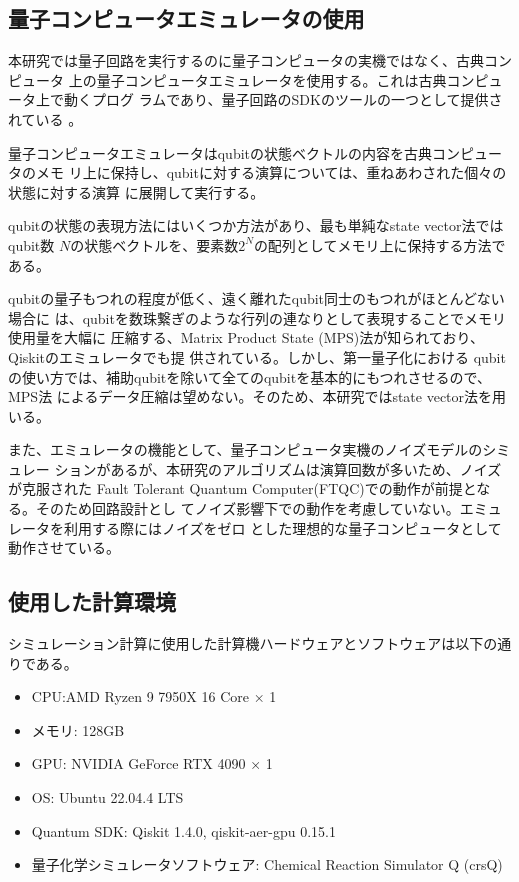 \documentclass[fontsize=11pt]{jlreq}
\begin{document}
\subsection{量子コンピュータエミュレータの使用}
本研究では量子回路を実行するのに量子コンピュータの実機ではなく、古典コンピュータ
上の量子コンピュータエミュレータを使用する。これは古典コンピュータ上で動くプログ
ラムであり、量子回路のSDKのツールの一つとして提供されている
\cite{website:qiskit-aer}。

量子コンピュータエミュレータはqubitの状態ベクトルの内容を古典コンピュータのメモ
リ上に保持し、qubitに対する演算については、重ねあわされた個々の状態に対する演算
に展開して実行する。

qubitの状態の表現方法にはいくつか方法があり、最も単純なstate vector法ではqubit数
$N$の状態ベクトルを、要素数$2^N$の配列としてメモリ上に保持する方法である。

qubitの量子もつれの程度が低く、遠く離れたqubit同士のもつれがほとんどない場合に
は、qubitを数珠繋ぎのような行列の連なりとして表現することでメモリ使用量を大幅に
圧縮する、Matrix Product State (MPS)法が知られており、Qiskitのエミュレータでも提
供されている\cite{Vidal2003.PhysRevLett.91.147902}。しかし、第一量子化における
qubitの使い方では、補助qubitを除いて全てのqubitを基本的にもつれさせるので、MPS法
によるデータ圧縮は望めない。そのため、本研究ではstate vector法を用いる。

また、エミュレータの機能として、量子コンピュータ実機のノイズモデルのシミュレー
ションがあるが、本研究のアルゴリズムは演算回数が多いため、ノイズが克服された
Fault Tolerant Quantum Computer(FTQC)での動作が前提となる。そのため回路設計とし
てノイズ影響下での動作を考慮していない。エミュレータを利用する際にはノイズをゼロ
とした理想的な量子コンピュータとして動作させている。


\subsection{使用した計算環境}
シミュレーション計算に使用した計算機ハードウェアとソフトウェアは以下の通りである。
\begin{itemize}
    \item CPU:AMD Ryzen 9 7950X 16 Core × 1
    \item メモリ: 128GB
    \item GPU: NVIDIA GeForce RTX 4090 × 1
    \item OS: Ubuntu 22.04.4 LTS
    \item Quantum SDK: Qiskit 1.4.0, qiskit-aer-gpu 0.15.1
    \item 量子化学シミュレータソフトウェア: Chemical Reaction Simulator Q (crsQ) \cite{website:crsq}
\end{itemize}
\end{document}
